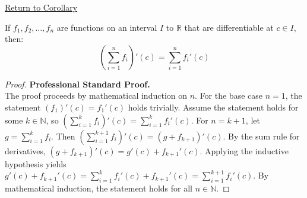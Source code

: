 \newpage
{}
\label{prf:finite-sum-rule}

\begin{remark*}[Return]
\hyperref[cor:finite-sum-rule]{Return to Corollary}
\end{remark*}

\begin{theorem*}
If $f_1, f_2, \dots, f_n$ are functions on an interval $I$ to $\mathbb{R}$ that are differentiable at $c \in I$, then:
\[ \left( \sum_{i=1}^{n} f_i \right)'(c) = \sum_{i=1}^{n} f_i'(c) \]
\end{theorem*}

\begin{proof}
\textbf{Professional Standard Proof.}~\\
The proof proceeds by mathematical induction on $n$. For the base case $n=1$, the statement $(f_1)'(c) = f_1'(c)$ holds trivially. Assume the statement holds for some $k \in \mathbb{N}$, so $\left( \sum_{i=1}^{k} f_i \right)'(c) = \sum_{i=1}^{k} f_i'(c)$. For $n = k+1$, let $g = \sum_{i=1}^{k} f_i$. Then $\left( \sum_{i=1}^{k+1} f_i \right)'(c) = (g + f_{k+1})'(c)$. By the sum rule for derivatives, $(g + f_{k+1})'(c) = g'(c) + f_{k+1}'(c)$. Applying the inductive hypothesis yields $g'(c) + f_{k+1}'(c) = \sum_{i=1}^{k} f_i'(c) + f_{k+1}'(c) = \sum_{i=1}^{k+1} f_i'(c)$. By mathematical induction, the statement holds for all $n \in \mathbb{N}$.
\end{proof}

